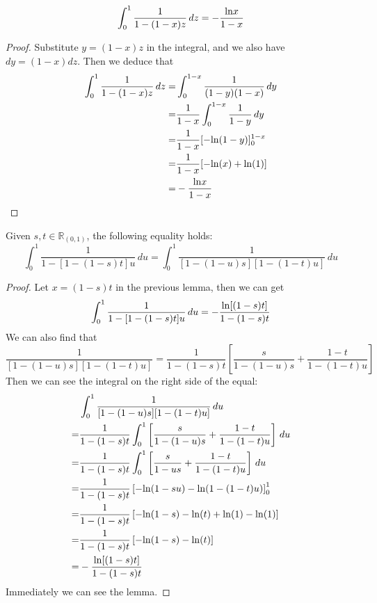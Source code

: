 \begin{lemma}\label{one_var_substitution}
    \[ \int_{0}^{1} \frac{1}{1 - (1 - x)z} \, dz= -\frac{{\rm ln}x}{1 - x} \]
\end{lemma}
\begin{proof}
    Substitute $y = (1 - x)z$ in the integral, and we also have $dy = (1-x)dz$. Then we deduce that
    \begin{align*}
        \int_{0}^{1} \frac{1}{1 - (1 - x)z} \, dz =& \int_{0}^{1-x} \frac{1}{(1 - y)(1-x)} \, dy \\
        =&\frac{1}{1-x}\int_{0}^{1-x} \frac{1}{1 - y} \, dy\\
        =&\frac{1}{1-x}[-{\rm ln}(1-y)]_0^{1-x} \\
        =&\frac{1}{1-x}[-{\rm ln}(x) + {\rm ln}(1)] \\
        =&-\frac{{\rm ln}x}{1 - x}
    \end{align*}
\end{proof}

\begin{lemma}\label{two_var_substitution}
    Given $s, t \in \mathbb{R}_{(0,1)}$, the following equality holds:
    \[ \int_{0}^{1} \frac{1}{1 - [1 - (1 - s)t]u} \, du = \int_{0}^{1} \frac{1}{[1 - (1 - u)s][1 - (1 - t)u]} \, du \]
\end{lemma}
\begin{proof}
    Let $x = (1 - s)t$ in the previous lemma, then we can get 
    \[ \int_{0}^{1} \frac{1}{1 - [1 - (1 - s)t]u} \, du = -\frac{{\rm ln}[(1 - s)t]}{1 - (1 - s)t}\]
    We can also find that
    \[ \frac{1}{[1 - (1 - u)s][1 - (1 - t)u]} = \frac{1}{1 - (1 - s)t}\left[\frac{s}{1 - (1 - u)s} + \frac{1-t}{1 - (1 - t)u} \right] \]
    Then we can see the integral on the right side of the equal:
    \begin{align*}
        &\int_{0}^{1} \frac{1}{[1 - (1 - u)s][1 - (1 - t)u]} \, du \\
        =&\frac{1}{1 - (1 - s)t}\int_{0}^{1} \left[\frac{s}{1 - (1 - u)s} + \frac{1-t}{1 - (1 - t)u} \right] \, du \\
        =&\frac{1}{1 - (1 - s)t}\int_{0}^{1} \left[\frac{s}{1 - us} + \frac{1-t}{1 - (1 - t)u} \right] \, du \\
        =&\frac{1}{1 - (1 - s)t}\left[-{\rm ln}(1-su)-{\rm ln}(1-(1-t)u) \right]_{0}^{1}\\
        =&\frac{1}{1 - (1 - s)t}\left[-{\rm ln}(1-s)-{\rm ln}(t)+{\rm ln}(1)-{\rm ln}(1) \right]\\
        =&\frac{1}{1 - (1 - s)t}\left[-{\rm ln}(1-s)-{\rm ln}(t) \right]\\
        =&-\frac{{\rm ln}[(1 - s)t]}{1 - (1 - s)t}
    \end{align*}
    Immediately we can see the lemma.
\end{proof}

